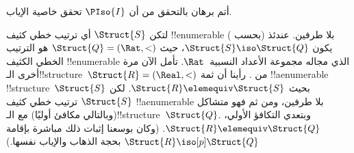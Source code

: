 \documentclass[../../../include/open-logic-section]{subfiles}
\begin{document}
\begin{prob}
  أتم برهان  بالتحقق من أن
  $\PIso{I}$ تحقق خاصية الإياب.
\end{prob}

\begin{rem}
  لتكن $\Struct{S}$ أي ترتيب خطي كثيف !!{enumerable} بلا طرفين. عندئذ
  (بحسب ) يكون $\Struct{S} \iso \Struct{Q}$، حيث
  $\Struct{Q} = (\Rat, <)$ هو الترتيب الخطي الكثيف !!{enumerable} الذي
  مجاله مجموعة الأعداد النسبية~$\Rat$. تأمل الآن مرة أخرى
  الـ!!{structure}~$\Struct{R} = (\Real, <)$ من
  . رأينا أن ثمة !!a{enumerable}
  !!{structure}~$\Struct{S}$ بحيث $\Struct{R} \elemequiv \Struct{S}$.
  لكن $\Struct{S}$ ترتيب خطي كثيف !!a{enumerable} بلا طرفين، ومن ثم فهو
  متشاكل (وبالتالي مكافئ أوليًا) مع الـ!!{structure}~$\Struct{Q}$.
  وبتعدي التكافؤ الأولي، $\Struct{R} \elemequiv \Struct{Q}$. (وكان
  بوسعنا إثبات ذلك مباشرة بإقامة $\Struct{R} \iso[p] \Struct{Q}$ بحجة
  الذهاب والإياب نفسها.)
\end{rem}
\end{document}
